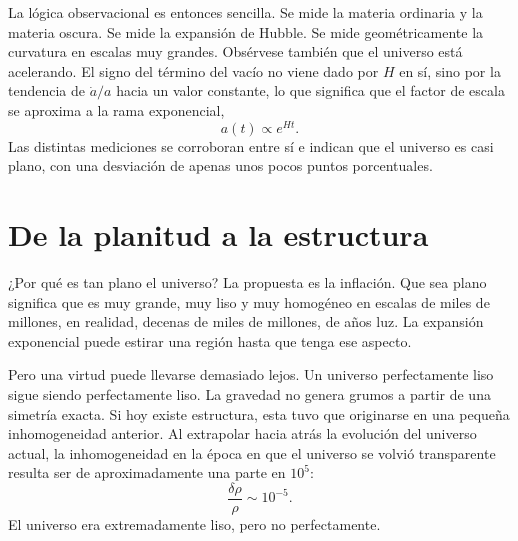 La lógica observacional es entonces sencilla. Se mide la materia ordinaria y la materia oscura. Se mide la expansión de Hubble. Se mide geométricamente la curvatura en escalas muy grandes. Obsérvese también que el universo está acelerando. El signo del término del vacío no viene dado por \(H\) en sí, sino por la tendencia de \(\dot a/a\) hacia un valor constante, lo que significa que el factor de escala se aproxima a la rama exponencial,
\begin{equation}
a(t)\propto e^{Ht}.
\end{equation}
Las distintas mediciones se corroboran entre sí e indican que el universo es casi plano, con una desviación de apenas unos pocos puntos porcentuales.

\begin{classroomqa}
\end{classroomqa}

\begin{classroomqa}
\end{classroomqa}

\enlargethispage{1pt}
\section{De la planitud a la estructura}

¿Por qué es tan plano el universo? La propuesta es la inflación. Que sea plano significa que es muy grande, muy liso y muy homogéneo en escalas de miles de millones, en realidad, decenas de miles de millones, de años luz. La expansión exponencial puede estirar una región hasta que tenga ese aspecto.

Pero una virtud puede llevarse demasiado lejos. Un universo perfectamente liso sigue siendo perfectamente liso. La gravedad no genera grumos a partir de una simetría exacta. Si hoy existe estructura, esta tuvo que originarse en una pequeña inhomogeneidad anterior. Al extrapolar hacia atrás la evolución del universo actual, la inhomogeneidad en la época en que el universo se volvió transparente resulta ser de aproximadamente una parte en \(10^5\):
\begin{equation}
\frac{\delta\rho}{\rho}\sim 10^{-5}.
\end{equation}
El universo era extremadamente liso, pero no perfectamente.


